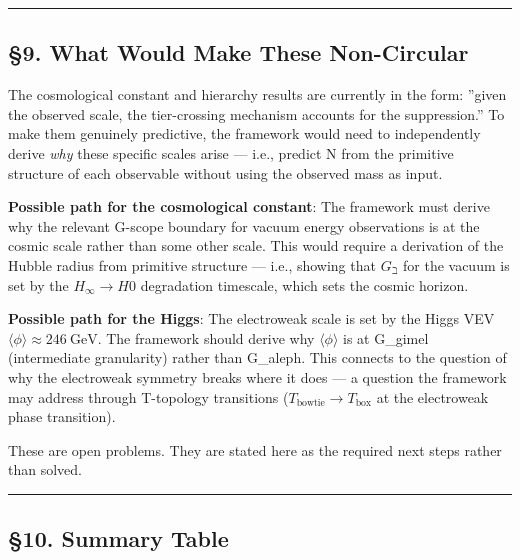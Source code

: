 \documentclass[12pt,a4paper]{article}
\newcommand{\pilcrow}{\S}
\begin{document}
\begin{center}
\rule{0.5\textwidth}{0.4pt}
\end{center}

\subsection{\pilcrow{}9. What Would Make These Non-Circular}

The cosmological constant and hierarchy results are currently in the form: ''given the observed scale, the tier-crossing mechanism accounts for the suppression.'' To make them genuinely predictive, the framework would need to independently derive \emph{why} these specific scales arise --- i.e., predict N from the primitive structure of each observable without using the observed mass as input.

\textbf{Possible path for the cosmological constant}: The framework must derive why the relevant G-scope boundary for vacuum energy observations is at the cosmic scale rather than some other scale. This would require a derivation of the Hubble radius from primitive structure --- i.e., showing that $G_{\beth}$ for the vacuum is set by the $H_{\infty} \to H0$ degradation timescale, which sets the cosmic horizon.

\textbf{Possible path for the Higgs}: The electroweak scale is set by the Higgs VEV $\langle \phi \rangle \approx 246\ \text{GeV}$. The framework should derive why $\langle \phi \rangle$ is at G\_gimel (intermediate granularity) rather than G\_aleph. This connects to the question of why the electroweak symmetry breaks where it does --- a question the framework may address through T-topology transitions ($T_{\text{bowtie}} \to T_{\text{box}}$ at the electroweak phase transition).

These are open problems. They are stated here as the required next steps rather than solved.

\begin{center}
\rule{0.5\textwidth}{0.4pt}
\end{center}

\subsection{\pilcrow{}10. Summary Table}
\end{document}

